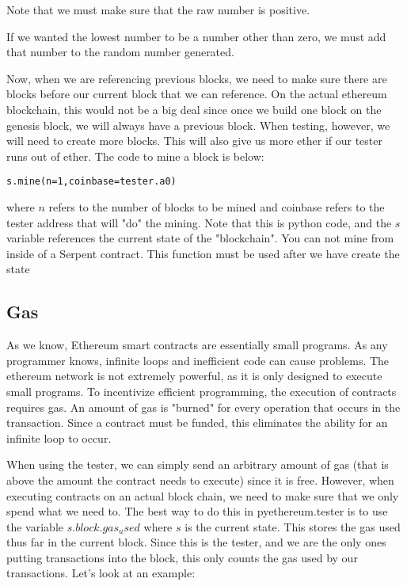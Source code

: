 \documentclass[12pt]{article}
\begin{document}
Note that we must make sure that the raw number is positive. \cite{PeterBorah2014}

If we wanted the lowest number to be a number other than zero, we must add that number to the random number generated. 

Now, when we are referencing previous blocks, we need to make sure there are blocks before our current block that we can reference. On the actual ethereum blockchain, this would not be a big deal since once we build one block on the genesis block, we will always have a previous block. When testing, however, we will need to create more blocks. This will also give us more ether if our tester runs out of ether. The code to mine a block is below:

\begin{verbatim}
s.mine(n=1,coinbase=tester.a0)
\end{verbatim}

where $n$ refers to the number of blocks to be mined and coinbase refers to the tester address that will "do" the mining. Note that this is python code, and the $s$ variable references the current state of the "blockchain". You can not mine from inside of a Serpent contract. This function must be used after we have create the state \cite{Usingpyethereum.tester}

\subsection{Gas}
As we know, Ethereum smart contracts are essentially small programs. As any programmer knows, infinite loops and inefficient code can cause problems. The ethereum network is not extremely powerful, as it is only designed to execute small programs. To incentivize efficient programming, the execution of contracts requires gas. An amount of gas is "burned" for every operation that occurs in the transaction. Since a contract must be funded, this eliminates the ability for an infinite loop to occur.

When using the tester, we can simply send an arbitrary amount of gas (that is above the amount the contract needs to execute) since it is free. However, when executing contracts on an actual block chain, we need to make sure that we only spend what we need to. The best way to do this in pyethereum.tester is to use the variable $s.block.gas_used$ where $s$ is the current state. This stores the gas used thus far in the current block. Since this is the tester, and we are the only ones putting transactions into the block, this only counts the gas used by our transactions. Let's look at an example:
\end{document}
